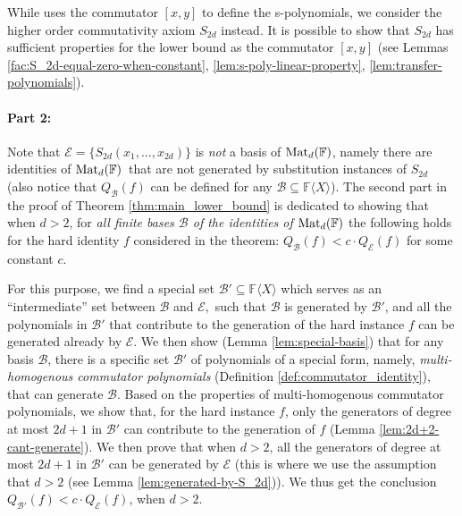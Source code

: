 \documentclass[12pt,reqno]{article}
\newcommand\F{\ensuremath{\mathbb F}}
\newcommand {\para}[1] {\paragraph{#1}}
\newcommand{\matd}{{\ensuremath{{\rm Mat}_d(\F)}}}
\newcommand{\freea}{\ensuremath{\F\langle X\rangle}}
\begin{document}
While \cite{Hru11} uses the commutator $[x,y]$ to define the s-polynomials, we consider the higher order commutativity axiom $S_{2d}$ instead. It is possible to show that  $S_{2d}$ has sufficient properties for the lower bound as the commutator $[x,y]$ (see Lemmas \ref{fac:S_2d-equal-zero-when-constant}, \ref{lem:s-poly-linear-property}, \ref{lem:transfer-polynomials}).

\para{Part 2:} Note that $\mathcal E=\{S_{2d}(x_1,\ldots,x_{2d})\}$ is \textit{not }a basis of \matd, namely there are identities of \matd \ that are not generated by substitution instances of $S_{2d}$ (also notice that $Q_{\mathcal B}(f)$ can be  defined for any $\mathcal B\subseteq \freea$). The second part in the proof of Theorem \ref{thm:main_lower_bound} is dedicated to showing that when $d>2$, for \textit{all finite bases $\mathcal B$ of the identities of \matd} the following holds for the hard identity $f$ considered in the theorem: $Q_{\mathcal B}(f)<c\cdot Q_{\mathcal E}(f)$ for some constant $c$.


For this purpose, we find a special set $\mathcal B'\subseteq \freea$ which serves as an  ``intermediate'' set between $\mathcal B$ and $\mathcal E,$ such that $\mathcal B$ is generated by $\mathcal B'$, and all the polynomials in $\mathcal B'$  that contribute to the generation of the hard instance $f$ can be generated already by $\mathcal E$. We then show (Lemma \ref{lem:special-basis}) that for any basis $\mathcal B$, there is a specific set $\mathcal B'$ of polynomials of a special form, namely, \textit{multi-homogenous commutator polynomials }(Definition \ref{def:commutator_identity}), that can generate $\mathcal B$. Based on the properties of multi-homogenous commutator polynomials, we show that, for the hard instance $f$, only the generators of degree at most $2d+1$ in $\mathcal B'$  can contribute to the generation of $f$ (Lemma \ref{lem:2d+2-cant-generate}). We then prove that  when $d>2$, all the generators of degree at most $2d+1$ in $\mathcal B'$ can be generated by $\mathcal E$ (this is where we use the assumption that $d>2$ (see Lemma \ref{lem:generated-by-S_2d})). We thus get the conclusion $Q_{\mathcal B'}(f)<c \cdot Q_{\mathcal E}(f)$, when $d>2$.\bigskip
\end{document}
